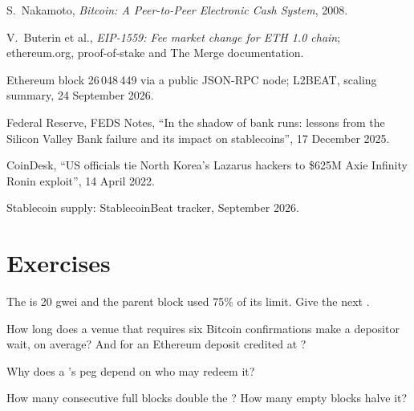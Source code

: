 \begin{omsources}
\item S.~Nakamoto, \emph{Bitcoin: A Peer-to-Peer Electronic Cash System}, 2008.
\item V.~Buterin et al., \emph{EIP-1559: Fee market change for ETH 1.0 chain}; ethereum.org, proof-of-stake and The
Merge documentation.
\item Ethereum block 26\,048\,449 via a public JSON-RPC node; L2BEAT, scaling summary, 24 September 2026.
\item Federal Reserve, FEDS Notes, ``In the shadow of bank runs: lessons from the Silicon Valley Bank failure and its
impact on stablecoins'', 17 December 2025.
\item CoinDesk, ``US officials tie North Korea's Lazarus hackers to \$625M Axie Infinity Ronin exploit'', 14 April
2022.
\item Stablecoin supply: StablecoinBeat tracker, September 2026.
\end{omsources}

\section{Exercises}

\begin{exercise}[$\star$]\label{exo:m3:blockchains-for-traders:1}
The  is 20 gwei and the parent block used 75\% of its limit. Give the next .
\end{exercise}

\begin{exercise}[$\star$]\label{exo:m3:blockchains-for-traders:2}
How long does a venue that requires six Bitcoin confirmations make a depositor wait, on average? And for an
Ethereum deposit credited at ?
\end{exercise}

\begin{exercise}[$\star$]\label{exo:m3:blockchains-for-traders:3}
Why does a 's peg depend on who may redeem it?
\end{exercise}

\begin{exercise}[$\star\star$]\label{exo:m3:blockchains-for-traders:4}
How many consecutive full blocks double the ? How many empty blocks halve it?
\end{exercise}

